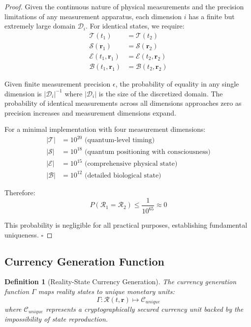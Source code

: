 \documentclass[12pt,a4paper]{article}
\newtheorem{definition}[theorem]{Definition}
\begin{document}
\begin{proof}
Given the continuous nature of physical measurements and the precision limitations of any measurement apparatus, each dimension $i$ has a finite but extremely large domain $\mathcal{D}_i$. For identical states, we require:
\begin{align}
\mathcal{T}(t_1) &= \mathcal{T}(t_2) \\
\mathcal{S}(\mathbf{r}_1) &= \mathcal{S}(\mathbf{r}_2) \\
\mathcal{E}(t_1,\mathbf{r}_1) &= \mathcal{E}(t_2,\mathbf{r}_2) \\
\mathcal{B}(t_1,\mathbf{r}_1) &= \mathcal{B}(t_2,\mathbf{r}_2)
\end{align}

Given finite measurement precision $\epsilon$, the probability of equality in any single dimension is $|\mathcal{D}_i|^{-1}$ where $|\mathcal{D}_i|$ is the size of the discretized domain. The probability of identical measurements across all dimensions approaches zero as precision increases and measurement dimensions expand.

For a minimal implementation with four measurement dimensions:
\begin{align}
|\mathcal{T}| &= 10^{20} \text{ (quantum-level timing)} \\
|\mathcal{S}| &= 10^{18} \text{ (quantum positioning with consciousness)} \\
|\mathcal{E}| &= 10^{15} \text{ (comprehensive physical state)} \\
|\mathcal{B}| &= 10^{12} \text{ (detailed biological state)}
\end{align}

Therefore:
\begin{equation}
P(\mathcal{R}_1 = \mathcal{R}_2) \leq \frac{1}{10^{65}} \approx 0
\end{equation}

This probability is negligible for all practical purposes, establishing fundamental uniqueness. $\square$
\end{proof}

\subsection{Currency Generation Function}

\begin{definition}[Reality-State Currency Generation]
The currency generation function $\Gamma$ maps reality states to unique monetary units:
\begin{equation}
\Gamma : \mathcal{R}(t,\mathbf{r}) \mapsto \mathcal{C}_{unique}
\end{equation}
where $\mathcal{C}_{unique}$ represents a cryptographically secured currency unit backed by the impossibility of state reproduction.
\end{definition}
\end{document}
